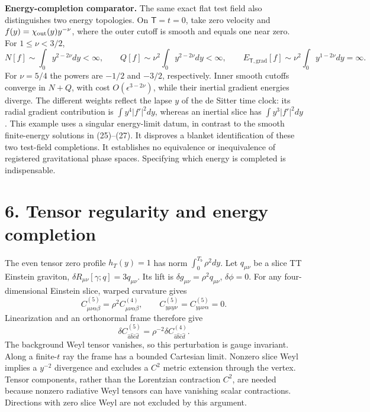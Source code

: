 \documentclass[
  11pt,
]{article}
\begin{document}
\textbf{Energy-completion comparator.} The same exact flat test field
also distinguishes two energy topologies. On \(\mathsf T=t=0\), take
zero velocity and \(f(y)=\chi_{\rm out}(y)y^{-\nu}\), where the outer
cutoff is smooth and equals one near zero. For \(1\le\nu<3/2\), \[
 N[f]\sim\int_0 y^{2-2\nu}dy<\infty,\qquad
 Q[f]\sim\nu^2\int_0 y^{2-2\nu}dy<\infty,\qquad
 E_{\mathsf T,\mathrm{grad}}[f]\sim
 \nu^2\int_0 y^{1-2\nu}dy=\infty.                    \tag{27a}
\] For \(\nu=5/4\) the powers are \(-1/2\) and \(-3/2\), respectively.
Inner smooth cutoffs converge in \(N+Q\), with cost
\(O(\epsilon^{3-2\nu})\), while their inertial gradient energies
diverge. The different weights reflect the lapse \(y\) of the de Sitter
time clock: its radial gradient contribution is \(\int y^4|f'|^2dy\),
whereas an inertial slice has \(\int y^3|f'|^2dy\). This example uses a
singular energy-limit datum, in contrast to the smooth finite-energy
solutions in (25)--(27). It disproves a blanket identification of these
two test-field completions. It establishes no equivalence or
inequivalence of registered gravitational phase spaces. Specifying which
energy is completed is indispensable.

\section{6. Tensor regularity and energy
completion}\label{tensor-regularity-and-energy-completion}

The even tensor zero profile \(h_T(y)=1\) has norm
\(\int_0^{T_b}\rho^2dy\). Let \(q_{\mu\nu}\) be a slice TT Einstein
graviton, \(\delta R_{\mu\nu}[\gamma;q]=3q_{\mu\nu}\). Its lift is
\(\delta g_{\mu\nu}=\rho^2q_{\mu\nu}\), \(\delta\phi=0\). For any
four-dimensional Einstein slice, warped curvature gives \[
 C^{(5)}_{\mu\nu\alpha\beta}=\rho^2C^{(4)}_{\mu\nu\alpha\beta},
 \qquad C^{(5)}_{y\mu y\nu}=C^{(5)}_{y\mu\nu\alpha}=0.
\] Linearization and an orthonormal frame therefore give \[
 \delta C^{(5)}_{\hat a\hat b\hat c\hat d}
 =\rho^{-2}\delta C^{(4)}_{\hat a\hat b\hat c\hat d}.   \tag{28}
\] The background Weyl tensor vanishes, so this perturbation is gauge
invariant. Along a finite-\(t\) ray the frame has a bounded Cartesian
limit. Nonzero slice Weyl implies a \(y^{-2}\) divergence and excludes a
\(C^2\) metric extension through the vertex. Tensor components, rather
than the Lorentzian contraction \(C^2\), are needed because nonzero
radiative Weyl tensors can have vanishing scalar contractions.
Directions with zero slice Weyl are not excluded by this argument.
\end{document}
